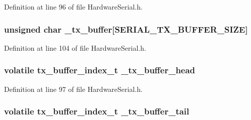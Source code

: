 Definition at line 96 of file Hardware\+Serial.\+h.

\hypertarget{class_hardware_serial_ae29711a762cbc9a7f622b4f4ff64d374}{}
\subsubsection[{\+\_\+tx\+\_\+buffer}]{\setlength{\rightskip}{0pt plus 5cm}unsigned char \+\_\+tx\+\_\+buffer\mbox{[}{\bf S\+E\+R\+I\+A\+L\+\_\+\+T\+X\+\_\+\+B\+U\+F\+F\+E\+R\+\_\+\+S\+I\+Z\+E}\mbox{]}\hspace{0.3cm}{\ttfamily [protected]}}\label{class_hardware_serial_ae29711a762cbc9a7f622b4f4ff64d374}


Definition at line 104 of file Hardware\+Serial.\+h.

\hypertarget{class_hardware_serial_abc7b62797e816bc704bfe3ec80f68607}{}
\subsubsection[{\+\_\+tx\+\_\+buffer\+\_\+head}]{\setlength{\rightskip}{0pt plus 5cm}volatile {\bf tx\+\_\+buffer\+\_\+index\+\_\+t} \+\_\+tx\+\_\+buffer\+\_\+head\hspace{0.3cm}{\ttfamily [protected]}}\label{class_hardware_serial_abc7b62797e816bc704bfe3ec80f68607}


Definition at line 97 of file Hardware\+Serial.\+h.

\hypertarget{class_hardware_serial_a3aad9ccd1bebab9d9226e0c38ee54465}{}
\subsubsection[{\+\_\+tx\+\_\+buffer\+\_\+tail}]{\setlength{\rightskip}{0pt plus 5cm}volatile {\bf tx\+\_\+buffer\+\_\+index\+\_\+t} \+\_\+tx\+\_\+buffer\+\_\+tail\hspace{0.3cm}{\ttfamily [protected]}}\label{class_hardware_serial_a3aad9ccd1bebab9d9226e0c38ee54465}


